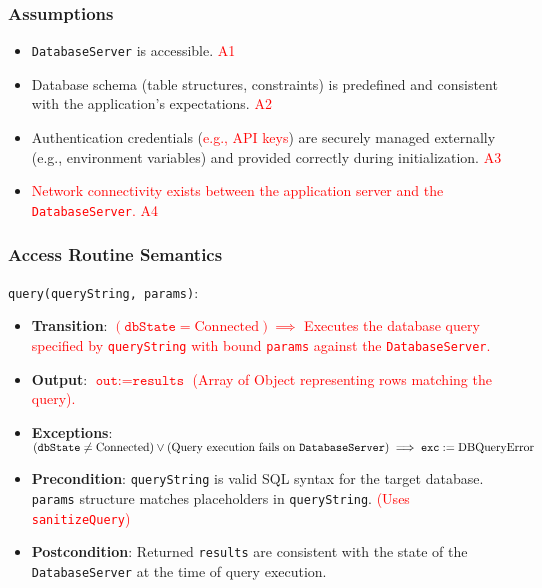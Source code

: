 \documentclass[12pt, titlepage]{article}
\begin{document}
\subsubsection{Assumptions}
\begin{itemize}
    \item \texttt{DatabaseServer} is accessible. \textcolor{red}{A1}
    \item Database schema (table structures, constraints) is predefined and consistent with the application's expectations. \textcolor{red}{A2}
    \item Authentication credentials (\textcolor{red}{e.g., API keys}) are securely managed externally (e.g., environment variables) and provided correctly during initialization. \textcolor{red}{A3}
    \item \textcolor{red}{Network connectivity exists between the application server and the \texttt{DatabaseServer}. A4}
\end{itemize}

\subsubsection{Access Routine Semantics}
\noindent \texttt{query(queryString, params)}:
\begin{itemize}
    \item \textbf{Transition}: \textcolor{red}{$(\texttt{dbState} = \text{Connected}) \implies$ Executes the database query specified by \texttt{queryString} with bound \texttt{params} against the \texttt{DatabaseServer}.}
    \item \textbf{Output}: \textcolor{red}{$\texttt{out} := \texttt{results}$ (Array of Object representing rows matching the query).}
    \item \textbf{Exceptions}: \textcolor{red}{$(\texttt{dbState} \neq \text{Connected}) \lor (\text{Query execution fails on \texttt{DatabaseServer}}) \implies \texttt{exc} := \text{DBQueryError}$}
    \item \textbf{Precondition}: \texttt{queryString} is valid SQL syntax for the target database. \texttt{params} structure matches placeholders in \texttt{queryString}. \textcolor{red}{(Uses \texttt{sanitizeQuery})}
    \item \textbf{Postcondition}: Returned \texttt{results} are consistent with the state of the \texttt{DatabaseServer} at the time of query execution.
\end{itemize}
\end{document}
